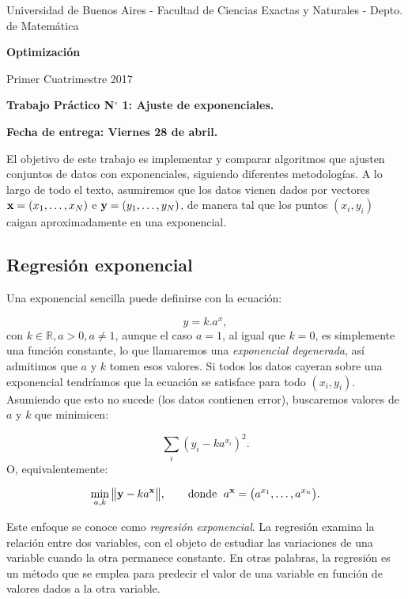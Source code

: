 \documentclass[12pt]{article}
\def \R{\ensuremath{\mathbb{R}}}
\begin{document}
 \centerline{{\small Universidad de Buenos Aires - Facultad de Ciencias Exactas y Naturales - Depto. de Matemática}}
 
 \vskip 0.2cm
 \hrulefill
 \vskip 0.2cm

 \centerline{{\bf\Huge {\sc Optimización}}}
 \vskip 0.2cm
 \centerline{\ttfamily Primer Cuatrimestre 2017}
 \hrulefill

 \bigskip
 \centerline{\bf Trabajo Práctico N$^\circ$ 1: Ajuste de exponenciales.}
 
 \centerline{\bf Fecha de entrega: Viernes 28 de abril.}
 \bigskip

 
 El objetivo de este trabajo es implementar y comparar algoritmos que ajusten conjuntos de datos con exponenciales, siguiendo diferentes metodologías. 
 A lo largo de todo el texto, asumiremos que los datos vienen dados por vectores ${\bf x} = (x_1,\dots,x_N)$ e ${\bf y} = (y_1,\dots,y_N)$, de manera tal que los puntos $(x_i,y_i)$ caigan aproximadamente en una exponencial. 
 
\subsection*{Regresión exponencial}
Una exponencial sencilla puede definirse con la ecuación:

\begin{equation}\label{regexp}
 y = k.a^x,
\end{equation}
con $k \in \R, a > 0, a \neq 1$, aunque el caso $a=1$, al igual que $k = 0$, es simplemente una función constante, lo que llamaremos una \emph{exponencial degenerada}, así admitimos que $a$ y $k$ tomen esos valores. Si todos los datos cayeran sobre una exponencial tendríamos que la ecuación se satisface para todo $(x_i,y_i)$. Asumiendo que esto no sucede (los datos contienen error), buscaremos valores de $a$ y $k$ que minimicen:

$$\sum_i (y_i - ka^{x_i})^2.$$
O, equivalentemente:

\begin{equation}
\min_{a,k} \big\|{\bf y} - ka^{\bf x} \big\|, \quad\quad\textrm{donde }\; a^{\bf x} =\big(a^{x_1}, \dots,a^{x_n}\big). 
\end{equation}

Este enfoque se conoce como \emph{regresión exponencial}. 
La regresión examina la relación entre dos variables, con el objeto de estudiar las variaciones de una variable cuando la otra permanece constante. En otras palabras, la regresión es un método que se emplea para predecir el valor de una variable en función de valores dados a la otra variable.
\end{document}
